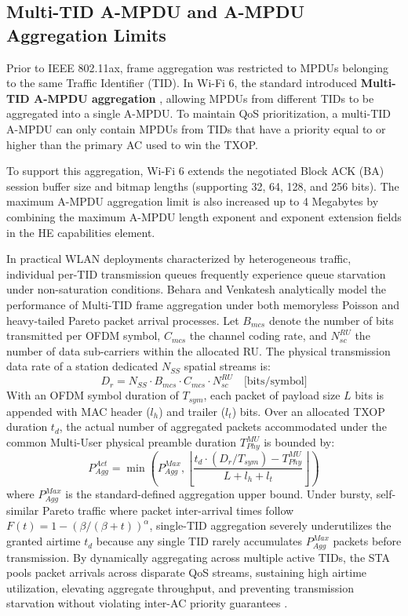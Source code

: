 \subsection{Multi-TID A-MPDU and A-MPDU Aggregation Limits}
Prior to IEEE 802.11ax, frame aggregation was restricted to MPDUs belonging to the same Traffic Identifier (TID). In Wi-Fi 6, the standard introduced \textbf{Multi-TID A-MPDU aggregation} \cite{gulasekaran2021wifi6}, allowing MPDUs from different TIDs to be aggregated into a single A-MPDU. To maintain QoS prioritization, a multi-TID A-MPDU can only contain MPDUs from TIDs that have a priority equal to or higher than the primary AC used to win the TXOP.

To support this aggregation, Wi-Fi 6 extends the negotiated Block ACK (BA) session buffer size and bitmap lengths (supporting 32, 64, 128, and 256 bits). The maximum A-MPDU aggregation limit is also increased up to 4 Megabytes by combining the maximum A-MPDU length exponent and exponent extension fields in the HE capabilities element.

In practical WLAN deployments characterized by heterogeneous traffic, individual per-TID transmission queues frequently experience queue starvation under non-saturation conditions. Behara and Venkatesh \cite{behara2023performance} analytically model the performance of Multi-TID frame aggregation under both memoryless Poisson and heavy-tailed Pareto packet arrival processes. Let $B_{mcs}$ denote the number of bits transmitted per OFDM symbol, $C_{mcs}$ the channel coding rate, and $N_{sc}^{RU}$ the number of data sub-carriers within the allocated RU. The physical transmission data rate of a station dedicated $N_{SS}$ spatial streams is:
\begin{equation}
    D_r = N_{SS} \cdot B_{mcs} \cdot C_{mcs} \cdot N_{sc}^{RU} \quad \text{[bits/symbol]}
\end{equation}
With an OFDM symbol duration of $T_{sym}$, each packet of payload size $L$ bits is appended with MAC header ($l_h$) and trailer ($l_t$) bits. Over an allocated TXOP duration $t_d$, the actual number of aggregated packets accommodated under the common Multi-User physical preamble duration $T_{Phy}^{MU}$ is bounded by:
\begin{equation}
    P_{Agg}^{Act} = \min\left(P_{Agg}^{Max}, \left\lfloor \frac{t_d \cdot (D_r / T_{sym}) - T_{Phy}^{MU}}{L + l_h + l_t} \right\rfloor \right)
\end{equation}
where $P_{Agg}^{Max}$ is the standard-defined aggregation upper bound. Under bursty, self-similar Pareto traffic where packet inter-arrival times follow $F(t) = 1 - (\beta / (\beta + t))^\alpha$, single-TID aggregation severely underutilizes the granted airtime $t_d$ because any single TID rarely accumulates $P_{Agg}^{Max}$ packets before transmission. By dynamically aggregating across multiple active TIDs, the STA pools packet arrivals across disparate QoS streams, sustaining high airtime utilization, elevating aggregate throughput, and preventing transmission starvation without violating inter-AC priority guarantees \cite{behara2023performance}.

